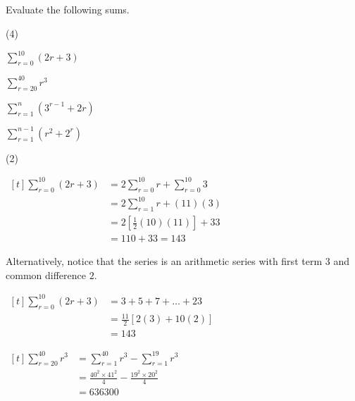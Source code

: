 \documentclass[11pt,a4paper]{book}
\begin{document}
\begin{example}

Evaluate the following sums.

\begin{tasks}[label=(\alph*),label-width=3.5ex](4)

\task ${\displaystyle \sum_{r=0}^{10}\left(2r+3\right)}$

\task ${\displaystyle \sum_{r=20}^{40}r^{3}}$

\task  ${\displaystyle \sum_{r=1}^{n}\left(3^{r-1}+2r\right)}$

\task  ${\displaystyle \sum_{r=1}^{n-1}\left(r^{2}+2^{r}\right)}$

\end{tasks}

\Solution

\begin{tasks}[label=(\alph*),label-width=3.5ex](2)

\task*  \begin{minipage}[t]{0.45\textwidth}

$
\begin{aligned}[t]
\sum_{r=0}^{10}\left(2r+3\right) & =2\sum_{r=0}^{10}r+\sum_{r=0}^{10}3\\
 & =2\sum_{r=1}^{10}r+\left(11\right)\left(3\right)\\
 & =2\left[\frac{1}{2}\left(10\right)\left(11\right)\right]+33\\
 & =110+33=143
\end{aligned}
$

\end{minipage}
\begin{minipage}[t]{0.45\textwidth}

Alternatively, notice that the series is an arithmetic series with
first term $3$ and common difference $2$.

$
\begin{aligned}[t]
\sum_{r=0}^{10}\left(2r+3\right) & =3+5+7+\ldots+23\\
 & =\frac{11}{2}\left[2\left(3\right)+10\left(2\right)\right]\\
 & =143
\end{aligned}
$

\end{minipage}

\task
$
\begin{aligned}[t]
\sum_{r=20}^{40}r^{3} & =\sum_{r=1}^{40}r^{3}-\sum_{r=1}^{19}r^{3}\\
 & =\frac{40^{2}\times41^{2}}{4}-\frac{19^{2}\times20^{2}}{4}\\
 & =636300
\end{aligned}
$


\end{tasks}
\end{example}
\end{document}
